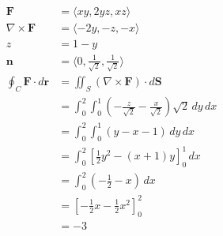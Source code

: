 \documentclass{article}
\begin{document}
\begin{align*}
  \mathbf{F}                            & = \langle x y, 2 y z, x z \rangle                                                              \\
  \nabla \times \mathbf{F}              & = \langle -2 y, -z, -x \rangle                                                                 \\
  z                                     & = 1 - y                                                                                        \\
  \mathbf{n}                            & = \langle 0, \frac{1}{\sqrt{2}}, \frac{1}{\sqrt{2}} \rangle                                    \\
  \oint_C \mathbf{F} \cdot d \mathbf{r} & = \iint_S (\nabla \times \mathbf{F}) \cdot d \mathbf{S}                                        \\
                                        & = \int_0^2 \int_0^1 \left( -\frac{z}{\sqrt{2}} - \frac{x}{\sqrt{2}} \right) \sqrt{2} \,dy \,dx \\
                                        & = \int_0^2 \int_0^1 (y - x - 1) \,dy \,dx                                                      \\
                                        & = \int_0^2 \left[ \frac{1}{2} y^2 - (x + 1) y \right]_0^1 \,dx                                 \\
                                        & = \int_0^2 \left( -\frac{1}{2} - x \right) \,dx                                                \\
                                        & = \left[ -\frac{1}{2} x - \frac{1}{2} x^2 \right]_0^2                                          \\
                                        & = -3
\end{align*}

\setcounter{subsubsection}{8}
\subsubsection{}
\end{document}
